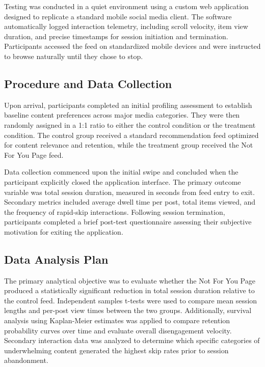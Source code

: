 \documentclass[10pt,leqno,twoside]{article}
\begin{document}
Testing was conducted in a quiet environment using a custom web application designed to replicate a standard mobile social media client. The software automatically logged interaction telemetry, including scroll velocity, item view duration, and precise timestamps for session initiation and termination. Participants accessed the feed on standardized mobile devices and were instructed to browse naturally until they chose to stop.

\subsection{Procedure and Data Collection}
Upon arrival, participants completed an initial profiling assessment to establish baseline content preferences across major media categories. They were then randomly assigned in a 1:1 ratio to either the control condition or the treatment condition. The control group received a standard recommendation feed optimized for content relevance and retention, while the treatment group received the Not For You Page feed.

Data collection commenced upon the initial swipe and concluded when the participant explicitly closed the application interface. The primary outcome variable was total session duration, measured in seconds from feed entry to exit. Secondary metrics included average dwell time per post, total items viewed, and the frequency of rapid-skip interactions. Following session termination, participants completed a brief post-test questionnaire assessing their subjective motivation for exiting the application.

\subsection{Data Analysis Plan}
The primary analytical objective was to evaluate whether the Not For You Page produced a statistically significant reduction in total session duration relative to the control feed. Independent samples t-tests were used to compare mean session lengths and per-post view times between the two groups. Additionally, survival analysis using Kaplan-Meier estimates was applied to compare retention probability curves over time and evaluate overall disengagement velocity. Secondary interaction data was analyzed to determine which specific categories of underwhelming content generated the highest skip rates prior to session abandonment.

\end{document}
